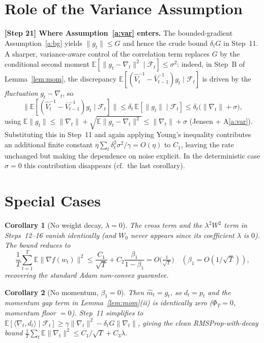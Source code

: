 \documentclass[11pt]{article}
\newtheorem{corollary}{Corollary}
\begin{document}
\section*{Role of the Variance Assumption}
\noindent\textbf{[Step 21] Where Assumption~\ref{a:var} enters.}
The bounded-gradient Assumption~\ref{a:bg} yields $\|g_t\|\le G$ and hence the crude
bound $\delta_t G$ in Step~11. A sharper, variance-aware control of the
correlation term replaces $G$ by the conditional second moment
$\mathbb{E}[\|g_t-\nabla_t\|^2\mid\mathcal F_t]\le\sigma^2$:
indeed, in Step~B of Lemma~\ref{lem:mom}, the discrepancy
$\mathbb{E}[(\hat V_t^{-1}-\bar V_{t-1}^{-1})g_t\mid\mathcal F_t]$ is driven by the
\emph{fluctuation} $g_t-\nabla_t$, so
\[
\big\|\mathbb{E}[(\hat V_t^{-1}-\bar V_{t-1}^{-1})g_t\mid\mathcal F_t]\big\|
\le \delta_t\,\mathbb{E}[\|g_t\|\mid\mathcal F_t]
\le \delta_t\big(\|\nabla_t\|+\sigma\big),
\]
using $\mathbb{E}\|g_t\|\le\|\nabla_t\|+\sqrt{\mathbb{E}\|g_t-\nabla_t\|^2}\le
\|\nabla_t\|+\sigma$ (Jensen + A\ref{a:var}). Substituting this in Step~11 and again
applying Young's inequality contributes an additional finite constant
$\eta\sum_t\delta_t^2\sigma^2/\gamma=O(\eta)$ to $C_1$, leaving the rate unchanged but
making the dependence on noise explicit. In the deterministic case $\sigma=0$ this
contribution disappears (cf.\ the last corollary).

\section*{Special Cases}
\begin{corollary}[No weight decay, $\lambda=0$]
The cross term and the $\lambda^2W^2$ term in Steps~12--16 vanish identically
(and $W_0$ never appears since its coefficient $\lambda$ is $0$). The bound reduces to
\[
\frac1T\sum_{t=1}^T\mathbb{E}\|\nabla f(w_t)\|^2
\le \frac{C_1}{\sqrt T}+C_2\frac{\beta_1}{1-\beta_1}=O\!\Big(\tfrac1{\sqrt T}\Big)
\quad(\beta_1=O(1/\sqrt T)),
\]
recovering the standard Adam non-convex guarantee.
\end{corollary}

\begin{corollary}[No momentum, $\beta_1=0$]
Then $\hat m_t=g_t$, so $d_t=p_t$ and the momentum gap term in
Lemma~\ref{lem:mom}(ii) is identically zero ($\Phi_T=0$, momentum floor $=0$).
Step~11 simplifies to
$\mathbb{E}[\langle\nabla_t,d_t\rangle\mid\mathcal F_t]\ge\gamma\|\nabla_t\|^2
-\delta_t G\|\nabla_t\|$, giving the clean RMSProp-with-decay bound
$\frac1T\sum_t\mathbb{E}\|\nabla_t\|^2\le C_1/\sqrt T+C_3\lambda$.
\end{corollary}
\end{document}
